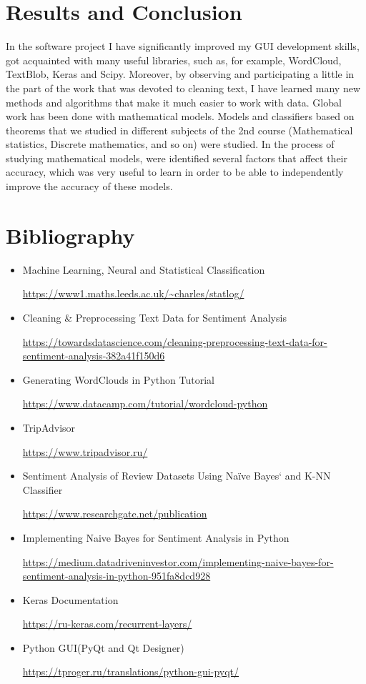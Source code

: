 \documentclass[]{article}
\begin{document}
\section{Results and Conclusion}
In the software project I have significantly improved my GUI development skills, got acquainted with many useful libraries, such as, for example, WordCloud, TextBlob, Keras and Scipy. Moreover, by observing and participating a little in the part of the work that was devoted to cleaning text, I have learned many new methods and algorithms that make it much easier to work with data. Global work has been done with mathematical models. Models and classifiers based on theorems that we studied in different subjects of the 2nd course (Mathematical statistics, Discrete mathematics, and so on) were studied. In the process of studying mathematical models, were identified several factors that affect their accuracy, which was very useful to learn in order to be able to independently improve the accuracy of these models.
\clearpage

\section{Bibliography}

\begin{itemize}
\item Machine Learning, Neural and Statistical Classification 

\url{https://www1.maths.leeds.ac.uk/~charles/statlog/}

\item Cleaning & Preprocessing Text Data for Sentiment Analysis 

\url{https://towardsdatascience.com/cleaning-preprocessing-text-data-for-sentiment-analysis-382a41f150d6}

\item Generating WordClouds in Python Tutorial 

\url{https://www.datacamp.com/tutorial/wordcloud-python}

\item TripAdvisor

\url{https://www.tripadvisor.ru/}

\item Sentiment Analysis of Review Datasets Using Naïve Bayes‘ and K-NN Classifier 

\url{https://www.researchgate.net/publication}

\item Implementing Naive Bayes for Sentiment Analysis in Python 

\url{https://medium.datadriveninvestor.com/implementing-naive-bayes-for-sentiment-analysis-in-python-951fa8dcd928}

\item Keras Documentation

\url{https://ru-keras.com/recurrent-layers/}

\item Python GUI(PyQt and Qt Designer)

\url{https://tproger.ru/translations/python-gui-pyqt/}
\end{itemize}


 
\end{document}
